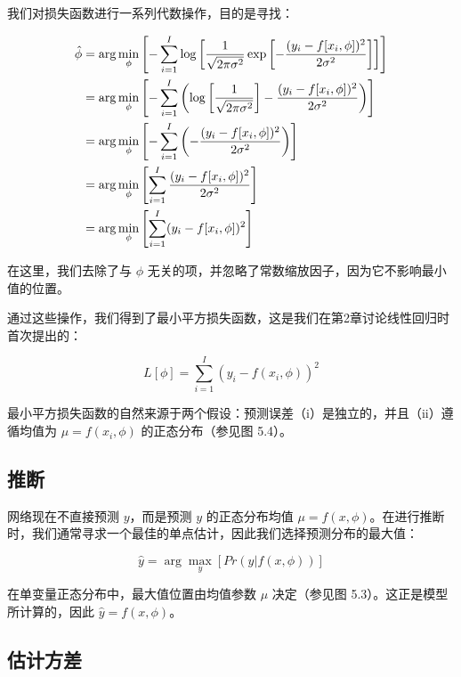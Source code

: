 \documentclass[lang=cn,newtx,10pt,scheme=chinese]{elegantbook}
\begin{document}
我们对损失函数进行一系列代数操作，目的是寻找：

\begin{align}
\hat{\phi} &= \arg\min_{\phi} \left[ -\sum_{i=1}^{I} \log \left[ \frac{1}{\sqrt{2\pi\sigma^2}} \exp \left[ -\frac{(y_i - f[x_i, \phi])^2}{2\sigma^2} \right] \right] \right] \notag \\
&= \arg\min_{\phi} \left[ -\sum_{i=1}^{I} \left( \log \left[ \frac{1}{\sqrt{2\pi\sigma^2}} \right] - \frac{(y_i - f[x_i, \phi])^2}{2\sigma^2} \right) \right] \notag \\
&= \arg\min_{\phi} \left[ -\sum_{i=1}^{I} \left( -\frac{(y_i - f[x_i, \phi])^2}{2\sigma^2} \right) \right] \notag \\
&= \arg\min_{\phi} \left[ \sum_{i=1}^{I} \frac{(y_i - f[x_i, \phi])^2}{2\sigma^2} \right] \notag \\
&= \arg\min_{\phi} \left[ \sum_{i=1}^{I} (y_i - f[x_i, \phi])^2 \right]
\end{align}

在这里，我们去除了与 \(\phi\) 无关的项，并忽略了常数缩放因子，因为它不影响最小值的位置。

通过这些操作，我们得到了最小平方损失函数，这是我们在第2章讨论线性回归时首次提出的：

\begin{equation}
L[\phi] = \sum_{i=1}^{I} (y_i - f(x_i, \phi))^2 
\end{equation}

最小平方损失函数的自然来源于两个假设：预测误差（i）是独立的，并且（ii）遵循均值为 \(\mu = f(x_i, \phi)\) 的正态分布（参见图 5.4）。

\subsection{推断}

网络现在不直接预测 \(y\)，而是预测 \(y\) 的正态分布均值 \(\mu = f(x, \phi)\)。在进行推断时，我们通常寻求一个最佳的单点估计，因此我们选择预测分布的最大值：

\begin{equation}
\hat{y} = \arg\max_y [Pr(y|f(x, \phi))] 
\end{equation}

在单变量正态分布中，最大值位置由均值参数 \(\mu\) 决定（参见图 5.3）。这正是模型所计算的，因此 \(\hat{y} = f(x, \phi)\)。

\subsection{估计方差}
\end{document}
